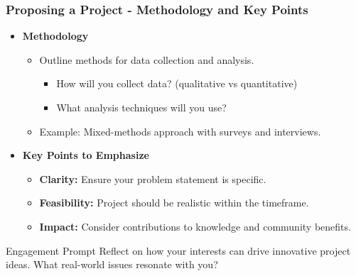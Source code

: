 \documentclass[aspectratio=169]{beamer}
\begin{document}
\begin{frame}[fragile]
    \frametitle{Proposing a Project - Methodology and Key Points}
    \begin{itemize}
        \item \textbf{Methodology}
        \begin{itemize}
            \item Outline methods for data collection and analysis.
            \begin{itemize}
                \item How will you collect data? (qualitative vs quantitative)
                \item What analysis techniques will you use? 
            \end{itemize}
            \item Example: Mixed-methods approach with surveys and interviews.
        \end{itemize}
        
        \item \textbf{Key Points to Emphasize}
        \begin{itemize}
            \item \textbf{Clarity:} Ensure your problem statement is specific.
            \item \textbf{Feasibility:} Project should be realistic within the timeframe.
            \item \textbf{Impact:} Consider contributions to knowledge and community benefits.
        \end{itemize}
    \end{itemize}
    
    \begin{block}{Engagement Prompt}
        Reflect on how your interests can drive innovative project ideas. What real-world issues resonate with you?
    \end{block}
\end{frame}
\end{document}

